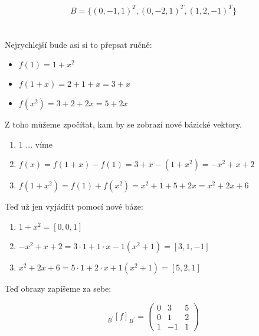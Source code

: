 \documentclass[10pt,a4paper]{article}
\begin{document}
\begin{enumerate}
\begin{equation*}
B = \{(0, -1, 1)^T, (0,-2,1)^T, (1,2,-1)^T \}
\end{equation*}

\end{enumerate}
\newpage
\section{}

Nejrychlejší bude asi si to přepsat ručně:

\begin{itemize}
\item $f(1) = 1 + x^2$
\item $f(1 + x) = 2 + 1 + x = 3 +x$
\item $f(x^2) = 3 + 2 + 2x = 5 + 2x$
\end{itemize}


Z toho můžeme zpočítat, kam by se zobrazí nové bázické vektory.

\begin{enumerate}
\item 1 ... víme
\item $f(x) = f(1 + x) - f(1) = 3 + x  - (1 + x^2) = -x^2 + x + 2 $
\item $f(1 + x^2) = f(1) + f(x^2)= x^2 + 1 + 5 + 2x = x^2 + 2x + 6$
\end{enumerate}

Teď už jen vyjádřit pomocí nové báze:

\begin{enumerate}
\item $1 + x^2 = [0,0,1]$
\item $-x^2 + x + 2 = 3\cdot 1 + 1\cdot x -1(x^2+1) = [3,1,-1]$
\item $x^2 + 2x + 6 =5\cdot 1 + 2\cdot x + 1(x^2+1) = [5,2,1] $
\end{enumerate}

Teď obrazy zapíšeme za sebe:

\begin{equation*}
{}_{B^\prime}[f]_{B^\prime} = \begin{pmatrix}
0 & 3 & 5\\
0 & 1 & 2\\
1 &-1 & 1
\end{pmatrix}
\end{equation*}
\end{document}
